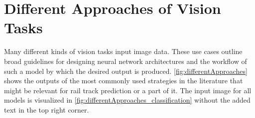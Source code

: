 \section{Different Approaches of Vision Tasks}
\label{sec:differentApproaches}

Many different kinds of vision tasks input image data.
These use cases outline broad guidelines for designing neural network architectures and the workflow of such a model by which the desired output is produced.
\autoref{fig:differentApproaches} shows the outputs of the most commonly used strategies in the literature that might be relevant for rail track prediction or a part of it.
The input image for all models is visualized in \autoref{fig:differentApproaches_classification} without the added text in the top right corner.

\vspace{1cm} %

